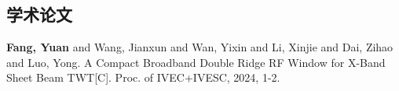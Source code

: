 \documentclass[master]{thesis-uestc}
\begin{document}
\begin{thesistheaccomplish}
    \section{学术论文}
     \textbf{Fang, Yuan} and Wang, Jianxun and Wan, Yixin and Li, Xinjie and Dai, Zihao and Luo, Yong. A Compact Broadband Double Ridge RF Window for X-Band Sheet Beam TWT[C]. Proc. of IVEC+IVESC, 2024, 1-2.
\end{thesistheaccomplish}


\end{document}
